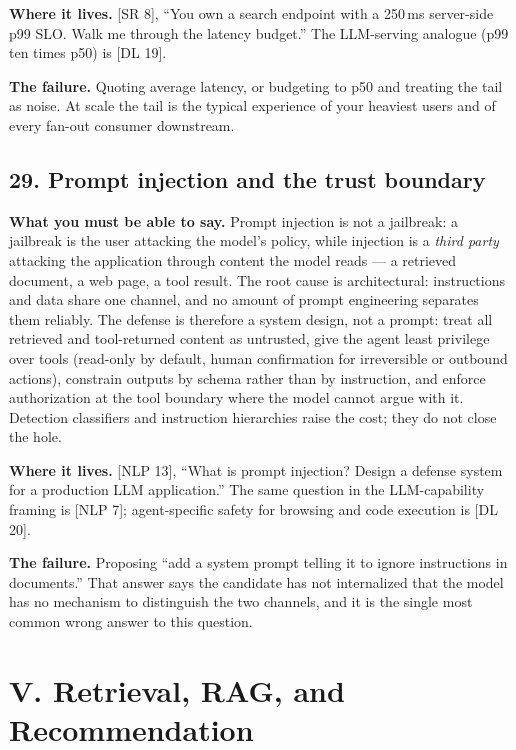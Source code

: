 \textbf{Where it lives.} [SR 8], ``You own a search endpoint with a 250\,ms server-side p99 SLO. Walk me through the latency budget.'' The LLM-serving analogue (p99 ten times p50) is [DL 19].

\textbf{The failure.} Quoting average latency, or budgeting to p50 and treating the tail as noise. At scale the tail is the typical experience of your heaviest users and of every fan-out consumer downstream.

\subsection*{29. Prompt injection and the trust boundary}

\textbf{What you must be able to say.} Prompt injection is not a jailbreak: a jailbreak is the user attacking the model's policy, while injection is a \emph{third party} attacking the application through content the model reads --- a retrieved document, a web page, a tool result. The root cause is architectural: instructions and data share one channel, and no amount of prompt engineering separates them reliably. The defense is therefore a system design, not a prompt: treat all retrieved and tool-returned content as untrusted, give the agent least privilege over tools (read-only by default, human confirmation for irreversible or outbound actions), constrain outputs by schema rather than by instruction, and enforce authorization at the tool boundary where the model cannot argue with it. Detection classifiers and instruction hierarchies raise the cost; they do not close the hole.

\textbf{Where it lives.} [NLP 13], ``What is prompt injection? Design a defense system for a production LLM application.'' The same question in the LLM-capability framing is [NLP 7]; agent-specific safety for browsing and code execution is [DL 20].

\textbf{The failure.} Proposing ``add a system prompt telling it to ignore instructions in documents.'' That answer says the candidate has not internalized that the model has no mechanism to distinguish the two channels, and it is the single most common wrong answer to this question.

\section*{V. Retrieval, RAG, and Recommendation}

